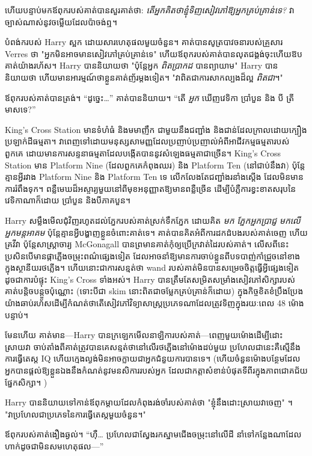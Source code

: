 ហើយបន្ទាប់មកឪពុករបស់គាត់បានសួរគាត់ថា: \emph{តើអ្នកគិតថាខ្ញុំទិញសៀវភៅឱ្យអ្នកគ្រប់គ្រាន់ទេ?} វាច្បាស់ណាស់នូវចម្លើយដែលប៉ាចង់ឮ។

បំពង់ករបស់ Harry ស្អក ដោយសារហេតុផលមួយចំនួន។ គាត់បានសូត្របាវចនារបស់គ្រួសារ Verres ថា "អ្នកមិនអាចមានសៀវភៅគ្រប់គ្រាន់ទេ" ហើយឪពុករបស់គាត់បានលុតជង្គង់ចុះហើយឱបគាត់យ៉ាងរហ័ស។ Harry បាននិយាយថា "ប៉ុន្តែអ្នក \emph{ពិតប្រាកដ} បានព្យាយាម" Harry បាននិយាយថា ហើយមានអារម្មណ៍ថាខ្លួនគាត់ញ័រម្តងទៀត។ "វាពិតជាការសាកល្បងដ៏ល្អ \emph{ពិតជា}។"

ឪពុក​របស់​គាត់​បាន​ត្រង់។ “ដូច្នេះ…” គាត់បាននិយាយ។ “តើ \emph{អ្នក} ឃើញវេទិកា ប្រាំបួន និង បី ត្រីមាសទេ?”

King's Cross Station មានទំហំធំ និងមមាញឹក ជាមួយនឹងជញ្ជាំង និងជាន់ដែលក្រាលដោយក្បឿងប្រឡាក់ដីធម្មតា។ វាពេញទៅដោយមនុស្សសាមញ្ញដែលប្រញាប់ប្រញាល់អំពីអាជីវកម្មធម្មតារបស់ពួកគេ ដោយមានការសន្ទនាធម្មតាដែលបង្កើតបាននូវសំឡេងធម្មតាជាច្រើន។ King's Cross Station មាន Platform Nine (ដែលពួកគេកំពុងឈរ) និង Platform Ten (នៅជាប់នឹងវា) ប៉ុន្តែគ្មានអ្វីរវាង Platform Nine និង Platform Ten ទេ លើកលែងតែជញ្ជាំងរនាំងស្តើង ដែលមិនមានការរំពឹងទុក។ ពន្លឺមេឃដ៏អស្ចារ្យមួយនៅពីមុខអនុញ្ញាតឱ្យមានពន្លឺច្រើន ដើម្បីបំភ្លឺការខ្វះខាតសរុបនៃវេទិកាណាក៏ដោយ ប្រាំបួន និងបីភាគបួន។

Harry សម្លឹងមើលជុំវិញរហូតដល់ភ្នែករបស់គាត់ស្រក់ទឹកភ្នែក ដោយគិត \emph{មក ភ្នែកអ្នកប្រាជ្ញ មកលើអ្នកមន្តអាគម} ប៉ុន្តែគ្មានអ្វីបង្ហាញខ្លួនចំពោះគាត់ទេ។ គាត់​បាន​គិត​អំពី​ការ​ដក​ដំបង​របស់​គាត់​ចេញ ហើយ​គ្រវី​វា ប៉ុន្តែ​សាស្ត្រាចារ្យ McGonagall បាន​ព្រមាន​គាត់​កុំ​ឲ្យ​ប្រើ​ក្រវាត់​ដៃ​របស់គាត់។ លើសពីនេះ ប្រសិនបើមានផ្កាភ្លើងចម្រុះពណ៌ផ្សេងទៀត ដែលអាចនាំឱ្យមានការចាប់ខ្លួនពីបទបាញ់កាំជ្រួចនៅខាងក្នុងស្ថានីយរថភ្លើង។ ហើយនោះជាការសន្មត់ថា wand របស់គាត់មិនបានសម្រេចចិត្តធ្វើអ្វីផ្សេងទៀត ដូចជាការបំផ្ទុះ King's Cross ទាំងអស់។ Harry បានត្រឹមតែសម្រិតសម្រាំងសៀវភៅសិក្សារបស់គាត់បន្តិចបន្តួចប៉ុណ្ណោះ (ទោះបីជា skim នោះពិតជាចម្លែកគ្រប់គ្រាន់ក៏ដោយ) ក្នុងកិច្ចខិតខំប្រឹងប្រែងយ៉ាងឆាប់រហ័សដើម្បីកំណត់ថាតើសៀវភៅវិទ្យាសាស្ត្រប្រភេទណាដែលត្រូវទិញក្នុងរយៈពេល 48 ម៉ោងបន្ទាប់។

មែនហើយ គាត់មាន—Harry បានក្រឡេកមើលនាឡិការបស់គាត់—ពេញមួយម៉ោងដើម្បីដោះស្រាយវា ចាប់តាំងពីគាត់ត្រូវបានគេសន្មត់ថានៅលើរថភ្លើងនៅម៉ោងដប់មួយ ប្រហែលជានេះគឺស្មើនឹងការធ្វើតេស្ត IQ ហើយក្មេងល្ងង់មិនអាចក្លាយជាអ្នកជំនួយការបានទេ។ (ហើយចំនួនម៉ោងបន្ថែមដែលអ្នកបានផ្តល់ឱ្យខ្លួនឯងនឹងកំណត់នូវមនសិការរបស់អ្នក ដែលជាកត្តាសំខាន់បំផុតទីពីរក្នុងភាពជោគជ័យផ្នែកសិក្សា។ )

Harry បាននិយាយទៅកាន់ឪពុកម្តាយដែលកំពុងរង់ចាំរបស់គាត់ថា "ខ្ញុំនឹងដោះស្រាយវាចេញ" ។ "វាប្រហែលជាប្រភេទនៃការធ្វើតេស្តមួយចំនួន។"

ឪពុក​របស់​គាត់​ងឿង​ឆ្ងល់។ “ហ៊ឺ… ប្រហែល​ជា​ស្វែង​រក​ស្នាម​ជើង​ចម្រុះ​នៅ​លើ​ដី នាំ​ទៅ​កន្លែង​ណា​ដែល​ហាក់​ដូច​ជា​មិន​សម​ហេតុផល—”

